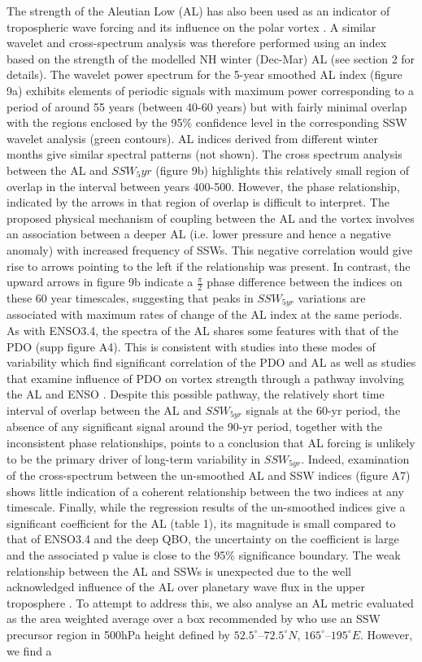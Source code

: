 The strength of the Aleutian Low (AL) has also been used as an indicator of tropospheric wave forcing and its influence on the polar vortex \citep{Woo2015}. A similar wavelet and cross-spectrum analysis was therefore performed using an index based on the strength of the modelled NH winter (Dec-Mar) AL (see section 2 for details). The wavelet power spectrum for the 5-year smoothed AL index (figure 9a) exhibits elements of periodic signals with maximum power corresponding to a period of around 55 years (between 40-60 years) but with fairly minimal overlap with the regions enclosed by the 95\% confidence level in the corresponding SSW wavelet analysis (green contours). AL indices derived from different winter months give similar spectral patterns (not shown).  The cross spectrum analysis between the AL and $SSW_5yr$ (figure 9b) highlights this relatively small region of overlap in the interval between years 400-500. However, the phase relationship, indicated by the arrows in that region of overlap is difficult to interpret. The proposed physical mechanism of coupling between the AL and the vortex \citep{Woo2015} involves an association between a deeper AL (i.e. lower pressure and hence a negative anomaly) with increased frequency of SSWs. This negative correlation would give rise to arrows pointing to the left if the relationship was present. In contrast, the upward arrows in figure 9b indicate a $\frac{\pi}{2}$ phase difference between the indices on these 60 year timescales, suggesting that peaks in $SSW_{5yr}$ variations are associated with maximum rates of change of the AL index at the same periods. As with ENSO3.4, the spectra of the AL shares some features with that of the PDO (supp figure A4). This is consistent with studies into these modes of variability which find significant correlation of the PDO and AL \citep{Mantua_1997, Rodionov2005} as well as studies that examine influence of PDO on vortex strength through a pathway involving the AL and ENSO \citep{rao2019}. Despite this possible pathway, the relatively short time interval of overlap between the AL and $SSW_{5yr}$ signals at the 60-yr period, the absence of any significant signal around the 90-yr period, together with the inconsistent phase relationships, points to a conclusion that AL forcing is unlikely to be the primary driver of long-term variability in $SSW_{5yr}$. Indeed, examination of the cross-spectrum between the un-smoothed AL and SSW indices (figure A7) shows little indication of a coherent relationship between the two indices at any timescale. Finally, while the regression results of the un-smoothed indices give a significant coefficient for the AL (table 1), its magnitude is small compared to that of ENSO3.4 and the deep QBO, the uncertainty on the coefficient is large and the associated p value is close to the 95\% significance boundary. The weak relationship between the AL and SSWs is unexpected due to the well acknowledged influence of the AL over planetary wave flux in the upper troposphere \citep{Woo2015}. To attempt to address this, we also analyse an AL metric evaluated as the area weighted average over a box recommended by \cite{Garfinkel2012whymight} who use an SSW precursor region in 500hPa height defined by $52.5^{\circ}$–$72.5^{\circ}N$, $165^{\circ}$–$195^{\circ}E$. However, we find a 